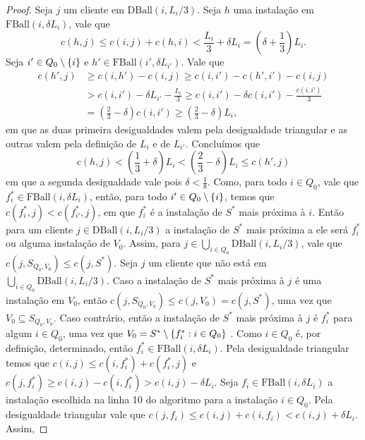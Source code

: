 \begin{proof}

    Seja $j$ um cliente em  $\text{DBall}(i,L_i/3)$. Seja $h$ uma instalação em $\text{FBall}(i,\delta L_i)$, vale que 
    \[c(h,j) \leq c(i,j) + c(h,i) < \frac{L_i}{3} + \delta L_i = (\delta + \frac{1}{3}) L_i.\]
        Seja $i' \in Q_0 \setminus \{i\}$ e $h' \in \text{FBall}(i',\delta L_{i'})$. Vale que 
        \begin{subequations}
            \begin{align*}
                c(h',j) &\geq c(i,h') - c(i,j) \geq c(i,i') - c(h',i') - c(i,j) \\
                &> c(i,i') - \delta L_{i'} - \frac{L_i}{3} \geq c(i,i') - \delta c(i,i') - \frac{c(i,i')}{3} \\
                &= \left(\frac{2}{3} - \delta\right) c(i,i') \geq \left(\frac{2}{3} - \delta \right) L_i,
            \end{align*}
        \end{subequations}
        em que as duas primeira desigualdades valem pela desigualdade triangular e as outras valem pela definição de $L_i$ e de $L_{i'}$. Concluímos que
        \[c(h,j) < \left( \frac{1}{3} + \delta  \right) L_i < \left(\frac{2}{3} - \delta\right) L_i \leq c(h',j)\]
        em que a segunda desigualdade vale pois $\delta < \frac{1}{8}$. Como, para todo $i\in Q_0$, vale que $f_{i}^* \in \text{FBall}(i,\delta L_i)$, então, para todo $i' \in Q_0 \setminus \{i\}$, temos que $c(f_{i}^*,j) < c(f_{i'}^*,j)$, em que $f_i^*$ é a instalação de $S^*$ mais próxima à $i$. Então para um cliente $j \in \text{DBall}(i,L_i/3)$ a instalação de $S^*$ mais próxima a ele será $f_i^*$ ou alguma instalação de $V_0$. Assim, para $j \in \bigcup_{i \in Q_0} \text{DBall}(i,L_i/3)$, vale que ${c(j, S_{Q_0,V_0}) \leq c(j,S^*)}$. Seja $j$ um cliente que não está em $\bigcup_{i \in Q_0} \text{DBall}(i,L_i/3)$. Caso a instalação de $S^*$ mais próxima à $j$ é uma instalação em $V_0$, então ${c(j,S_{Q_0,V_0}) \leq c(j,V_0) = c(j,S^*)}$, uma vez que $V_0 \subseteq S_{Q_0,V_0}$. Caso contrário, então a instalação de $S^*$ mais próxima à $j$ é $f_i^*$ para algum $i \in Q_0$, uma vez que ${V_0 = S^* \setminus \{f_i^* : i \in Q_0\}}$ . Como $i \in Q_0$ é, por definição, determinado, então $f_i^* \in \text{FBall}(i,\delta L_i)$. Pela desigualdade triangular temos que ${c(i,j) \leq c(i,f_i^*) + c(f_i^*,j)}$ e ${c(j,f_i^*) \geq c(i,j) - c(i,f_i^*) > c(i,j) - \delta L_i}$. Seja $f_i \in \text{FBall}(i,\delta L_i)$ a instalação escolhida na linha 10 do algoritmo para a instalação $i \in Q_0$. Pela desigualdade triangular vale que ${c(j,f_i) \leq c(i,j) + c(i,f_i) < c(i,j) + \delta L_i}$. Assim, 

\end{proof}
